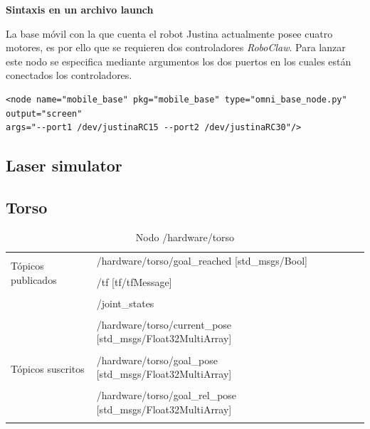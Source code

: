 \documentclass[user_manual.tex]{subfiles}
\begin{document}
\textbf{Sintaxis en un archivo launch}

La base móvil con la que cuenta el robot Justina actualmente posee cuatro motores, es por ello que se requieren dos controladores \textit{RoboClaw}. Para lanzar este nodo se especifica mediante argumentos los dos puertos en los cuales están conectados los controladores.\\
\begin{verbatim}
<node name="mobile_base" pkg="mobile_base" type="omni_base_node.py" output="screen" 
args="--port1 /dev/justinaRC15 --port2 /dev/justinaRC30"/>
\end{verbatim}

\subsection{Laser simulator}

\subsection{Torso}

\begin{table}[H]
\begin{center}
\begin{tabular}{|l|p{6cm}|p{5cm}|}%
\hline

\multirow{4}{*}{Tópicos publicados}
& /hardware/torso/goal\_reached [std\_msgs/Bool] &  \\
& & \\
& /tf [tf/tfMessage] &  \\
& & \\
& /joint\_states  &  \\
& & \\
& /hardware/torso/current\_pose [std\_msgs/Float32MultiArray] &  \\
& & \\
\cline{1-3}

\multirow{2}{*}{Tópicos suscritos}
& /hardware/torso/goal\_pose [std\_msgs/Float32MultiArray] &  \\
& & \\
& /hardware/torso/goal\_rel\_pose [std\_msgs/Float32MultiArray] &  \\
& & \\
\cline{1-3} 

\end{tabular}
\caption{Nodo /hardware/torso}
\label{torso node}
\end{center}
\end{table}
\end{document}
